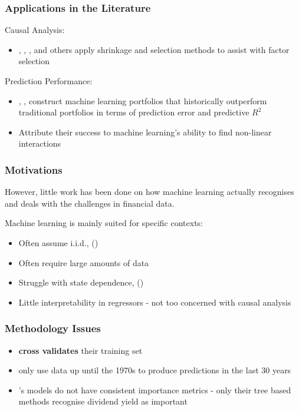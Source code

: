 \documentclass[aspectratio=169]{beamer}
\begin{document}
\begin{frame}
\frametitle{Applications in the Literature}
Causal Analysis:
\begin{itemize}
	\item \cite{kozak_shrinking_2017}, \cite{rapach_forecasting_2013}, \cite{freyberger_dissecting_2017}, and others apply shrinkage and selection methods to assist with factor selection
\end{itemize}
Prediction Performance:
\begin{itemize}
	\item \cite{gu_empirical_2018}, \cite{feng_deep_2018}, construct machine learning portfolios that historically outperform traditional portfolios in terms of prediction error and predictive $R^2$
	\item Attribute their success to machine learning's ability to find non-linear interactions
\end{itemize}
\end{frame}

\begin{frame}
\frametitle{Motivations}
However, little work has been done on how machine learning actually recognises and deals with the challenges in financial data. 

Machine learning is mainly suited for specific contexts:
\begin{itemize}
	\item Often assume i.i.d., (\cite{murphy_quantifying_2010})
	\item Often require large amounts of data
	\item Struggle with state dependence, (\cite{bengio_learning_1994})
	\item Little interpretability in regressors - not too concerned with causal analysis
\end{itemize}
\end{frame}

\begin{frame}
\frametitle{Methodology Issues}
\begin{itemize}
	\item \cite{feng_deep_2018} \textbf{cross validates} their training set
	\item \cite{gu_empirical_2018} only use data up until the 1970s to produce predictions in the last 30 years
	\item \cite{gu_empirical_2018}'s models do not have consistent importance metrics - only their tree based methods recognise dividend yield as important
\end{itemize}
\end{frame}
\end{document}
